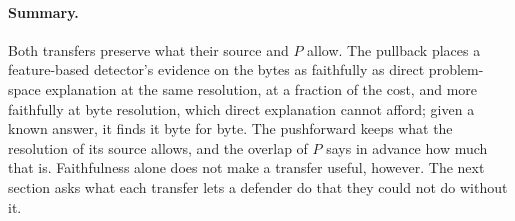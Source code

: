 \paragraph{Summary.} Both transfers preserve what their source and $P$ allow. The pullback places a feature-based detector's evidence on the bytes as faithfully as direct problem-space explanation at the same resolution, at a fraction of the cost, and more faithfully at byte resolution, which direct explanation cannot afford; given a known answer, it finds it byte for byte. The pushforward keeps what the resolution of its source allows, and the overlap of $P$ says in advance how much that is. Faithfulness alone does not make a transfer useful, however. The next section asks what each transfer lets a defender do that they could not do without it.
